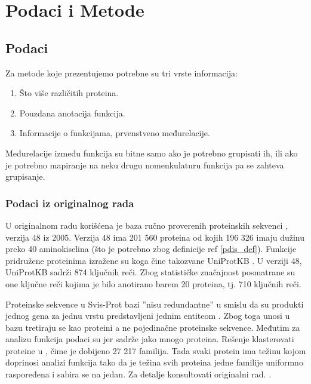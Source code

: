 
\chapter{Podaci i Metode} %

\label{Podaci i Metode} %



\section {Podaci}

Za metode koje prezentujemo potrebne su tri vrste informacija:
\begin{enumerate}
  \item Što više različitih proteina.
  \item Pouzdana anotacija funkcija.
  \item Informacije o funkcijama, prvenstveno međurelacije.
\end{enumerate}

Međurelacije između funkcija su bitne samo ako je potrebno grupisati ih,
ili ako je potrebno mapiranje na neku drugu nomenkulaturu funkcija pa
se zahteva grupisanje.


\subsection{Podaci iz originalnog rada}

U originalnom radu \parencite{Xie2007} korišćena je  baza ručno proverenih
proteinskih sekvenci  , verzija 48 iz 2005.
Verzija 48 ima 201 560 proteina od kojih 196 326 imaju dužinu preko 40
aminokiselina (što je potrebno zbog definicije ref \ref{pdis_def}). Funkcije
pridružene proteinima izražene su 
 koga čine takozvane UniProtKB 
. U verziji 48, UniProtKB sadrži 874 ključnih reči.  Zbog
statističke značajnost posmatrane su one ključne reči kojima je bilo anotirano
barem 20 proteina, tj. 710 ključnih reči.

Proteinske sekvence u Svis-Prot bazi ''nisu redundantne'' u smislu da 
su produkti jednog gena za jednu vrstu predstavljeni jednim entiteom 
\parencite{nonRedundant}. Zbog toga unosi u bazu tretiraju se kao proteini a ne
pojedinačne proteinske sekvence.
Međutim za analizu funkcija podaci su  jer
sadrže jako mnogo  proteina. Rešenje  klasterovati proteine
u , čime je dobijeno 27 217 familija.  Tada svaki
protein ima težinu kojom doprinosi analizi funkcija tako da je težina svih
proteina jedne familije uniformno raspoređena i sabira se na jedan.  Za detalje
konsultovati originalni rad. \parencite{Xie2007}.

